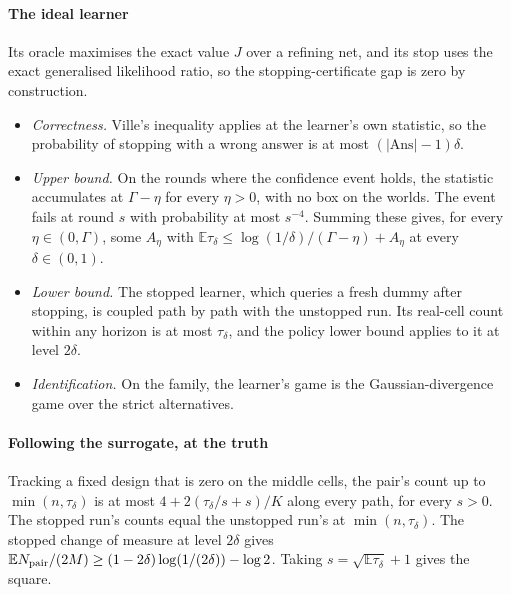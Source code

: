 \paragraph{The ideal learner} Its oracle maximises the exact value $J$ over a refining net, and
its stop uses the exact generalised likelihood ratio, so the stopping-certificate gap is zero
by construction.
\begin{itemize}
\item \emph{Correctness.} Ville's inequality applies at the learner's own statistic, so the
probability of stopping with a wrong answer is at most $(|\mathrm{Ans}|-1)\delta$.
\item \emph{Upper bound.} On the rounds where the confidence event holds, the statistic
accumulates at $\Gamma-\eta$ for every $\eta>0$, with no box on the worlds. The event fails at
round $s$ with probability at most $s^{-4}$. Summing these gives, for every
$\eta\in(0,\Gamma)$, some $A_{\eta}$ with
$\mathbb{E}\tau_{\delta}\le\log(1/\delta)/(\Gamma-\eta)+A_{\eta}$ at every $\delta\in(0,1)$.
\item \emph{Lower bound.} The stopped learner, which queries a fresh dummy after stopping, is
coupled path by path with the unstopped run. Its real-cell count within any horizon is at most
$\tau_{\delta}$, and the policy lower bound applies to it at level $2\delta$.
\item \emph{Identification.} On the family, the learner's game is the Gaussian-divergence game
over the strict alternatives.
\end{itemize}


\paragraph{Following the surrogate, at the truth} Tracking a fixed design that is zero on the
middle cells, the pair's count up to $\min(n,\tau_{\delta})$ is at most
$4+2(\tau_{\delta}/s+s)/K$ along every path, for every $s>0$. The stopped run's counts equal the
unstopped run's at $\min(n,\tau_{\delta})$. The stopped change of measure at level $2\delta$
gives $\mathbb{E}N_{\rm pair}/(2M)\ge(1-2\delta)\log(1/(2\delta))-\log2$. Taking
$s=\sqrt{\mathbb{E}\tau_{\delta}}+1$ gives the square.

